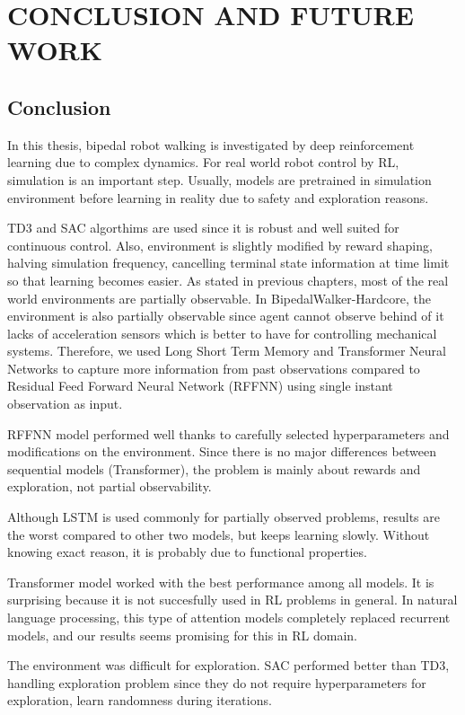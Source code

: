 \chapter{CONCLUSION AND FUTURE WORK}
\label{chap:conclusion_future_work}

\section{Conclusion}
\label{sec:conclusion}
In this thesis, bipedal robot walking is investigated by deep  reinforcement learning due to complex dynamics. 
For real world robot control by RL, simulation is an important step. 
Usually, models are pretrained in simulation environment before learning in reality due to safety and exploration reasons. 

TD3 and SAC algorthims are used since it is robust and well suited for continuous control. 
Also, environment is slightly modified by reward shaping, halving simulation frequency, cancelling terminal state information at time limit so that learning becomes easier.  
As stated in previous chapters, most of the real world environments are partially observable. 
In BipedalWalker-Hardcore, the environment is also partially observable since agent cannot observe behind of it lacks of acceleration sensors which is better to have for controlling mechanical systems. 
Therefore, we used Long Short Term Memory and Transformer Neural Networks to capture more information from past observations compared to Residual Feed Forward Neural Network (RFFNN) using single instant observation as input. 

RFFNN model performed well thanks to carefully selected hyperparameters and modifications on the environment. 
Since there is no major differences between sequential models (Transformer), the problem is mainly about rewards and exploration, not partial observability. 

Although LSTM is used commonly for partially observed problems, results are the worst compared to other two models, but keeps learning slowly. 
Without knowing exact reason, it is probably due to functional properties. 

Transformer model worked with the best performance among all models. 
It is surprising because it is not succesfully used in RL problems in general. 
In natural language processing, this type of attention models completely replaced recurrent models, and our results seems promising for this in RL domain. 

The environment was difficult for exploration. SAC performed better than TD3, handling exploration problem since they do not require hyperparameters for exploration, learn randomness during iterations. 
